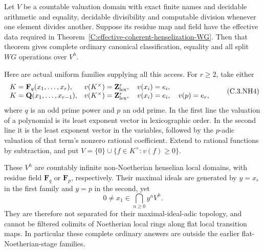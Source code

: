 \begin{corollary}
\label{C:lexicographic-valuation-henselization-WG}
Let $V$ be a countable valuation domain with
exact finite names and decidable arithmetic
and equality, decidable divisibility and
computable division whenever one element
divides another.  Suppose its residue
map and field have the effective data
required in
Theorem~\ref{C:effective-coherent-henselization-WG}.
Then that theorem gives complete ordinary
canonical classification, equality and
all split $WG$ operations over $V^h$.

Here are actual uniform families supplying
all this access.  For $r\geq2$, take either
\[
 \begin{array}{ll}
 K=\mathbf F_q(x_1,\ldots,x_r),
     &v(K^\times)=\mathbf Z^r_{\rm lex},\quad
       v(x_i)=e_i,\\
 K=\mathbf Q(x_1,\ldots,x_{r-1}),
     &v(K^\times)=\mathbf Z^r_{\rm lex},\quad
       v(x_i)=e_i,\quad v(p)=e_r,
 \end{array}                                              \tag{C.3.NH4}
\]
where $q$ is an odd prime power and $p$ an
odd prime.  In the first line the valuation
of a polynomial is its least exponent
vector in lexicographic order.
In the second line it is the least
exponent vector in the variables,
followed by the $p$-adic valuation
of that term's nonzero rational
coefficient.  Extend to rational
functions by subtraction, and put
$V=\{0\}\cup\{f\in K^\times:v(f)\geq0\}$.

These $V^h$ are countably infinite
non-Noetherian henselian local domains,
with residue field $\mathbf F_q$
or $\mathbf F_p$, respectively.
Their maximal ideals are generated
by $y=x_r$ in the first family
and $y=p$ in the second, yet
\[
             0\ne x_1\in\bigcap_{n\geq0} y^nV^h.       \tag{C.3.NH5}
\]
They are therefore not separated for
their maximal-ideal-adic topology,
and cannot be filtered colimits
of Noetherian local rings along
flat local transition maps.
In particular these complete ordinary
answers are outside the earlier
flat-Noetherian-stage families.
\end{corollary}
